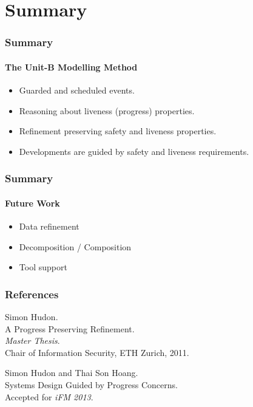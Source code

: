 \section{Summary}
\label{sec:summary}

\begin{frame}
  \frametitle{Summary}
  \framesubtitle{The Unit-B Modelling Method}

  \begin{itemize}
  \item Guarded and \alert{scheduled} events.
    \medskip
  \item Reasoning about \alert{liveness (progress) properties}.
    \medskip
  \item \alert{Refinement} preserving safety and liveness properties.
    \medskip
  \item Developments are \alert{guided by safety and liveness requirements}.
  \end{itemize}
\end{frame}

\begin{frame}
  \frametitle{Summary}
  \framesubtitle{Future Work}

  \begin{itemize}
  \item Data refinement
    \medskip
  \item Decomposition / Composition
    \medskip
  \item Tool support
  \end{itemize}
\end{frame}

\begin{frame}[allowframebreaks]
  \frametitle{References}
  
  \begin{thebibliography}{10}
    
    \beamertemplatebookbibitems
    Simon Hudon.\\
    A Progress Preserving Refinement.\\
    \emph{Master Thesis}.\\
    Chair of Information Security, ETH Zurich, 2011.
    
    \beamertemplatearticlebibitems
    
    Simon Hudon and Thai Son Hoang.\\
    Systems Design Guided by Progress Concerns.\\
    Accepted for \emph{iFM 2013}.
    
  \end{thebibliography}
\end{frame}



